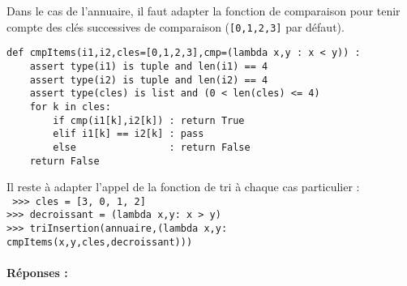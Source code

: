 \documentclass[11pt,a4paper]{article}
\begin{document}
\noindent
Dans le cas de l'annuaire, il faut adapter la fonction de comparaison pour tenir compte des
clés successives de comparaison (\texttt{[0,1,2,3]} par défaut).

\begin{minipage}[t]{14cm}\footnotesize
\begin{lstlisting}
def cmpItems(i1,i2,cles=[0,1,2,3],cmp=(lambda x,y : x < y)) :
    assert type(i1) is tuple and len(i1) == 4
    assert type(i2) is tuple and len(i2) == 4
    assert type(cles) is list and (0 < len(cles) <= 4)
    for k in cles:
        if cmp(i1[k],i2[k]) : return True
        elif i1[k] == i2[k] : pass
        else                : return False
    return False
\end{lstlisting}
\end{minipage}

\noindent
Il reste à adapter l'appel de la fonction de tri à chaque cas particulier :\\
\texttt{\footnotesize
>{>}> cles = [3, 0, 1, 2]\\
>{>}> decroissant = (lambda x,y: x > y)\\
>{>}> triInsertion(annuaire,(lambda x,y: cmpItems(x,y,cles,decroissant)))
}

\paragraph{Réponses :}\mbox{}
\end{document}
